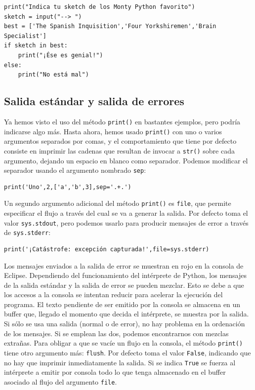 \begin{lstlisting}
print("Indica tu sketch de los Monty Python favorito")
sketch = input("--> ")
best = ['The Spanish Inquisition','Four Yorkshiremen','Brain Specialist']
if sketch in best:
	print("¡Ése es genial!")
else:
    print("No está mal")
\end{lstlisting}

\subsection{Salida estándar y salida de errores}

Ya hemos visto el uso del método \texttt{print()} en bastantes ejemplos, pero podría indicarse algo más. Hasta ahora, hemos usado \texttt{print()} con uno o varios argumentos separados por comas, y el comportamiento que tiene por defecto consiste en imprimir las cadenas que resultan de invocar a \texttt{str()} sobre cada argumento, dejando un espacio en blanco como separador. Podemos modificar el separador usando el argumento nombrado \texttt{sep}:

\begin{lstlisting}
print('Uno',2,['a','b',3],sep='.+.')
\end{lstlisting}

Un segundo argumento adicional del método \texttt{print()} es \texttt{file}, que permite especificar el flujo a través del cual se va a generar la salida. Por defecto toma el valor \texttt{sys.stdout}, pero podemos usarlo para producir mensajes de error a través de \texttt{sys.stderr}:

\begin{lstlisting}
print('¡Catástrofe: excepción capturada!',file=sys.stderr)
\end{lstlisting}

Los mensajes enviados a la salida de error se muestran en rojo en la consola de Eclipse. Dependiendo del funcionamiento del intérprete de Python, los mensajes de la salida estándar y la salida de error se pueden mezclar. Esto se debe a que los accesos a la consola se intentan reducir para acelerar la ejecución del programa. El texto pendiente de ser emitido por la consola se almacena en un buffer que, llegado el momento que decida el intérprete, se muestra por la salida. Si sólo se usa una salida (normal o de error), no hay problema en la ordenación de los mensajes. Si se emplean las dos, podemos encontrarnos con mezclas extrañas. Para obligar a que se vacíe un flujo en la consola, el método \texttt{print()} tiene otro argumento más: \texttt{flush}. Por defecto toma el valor \texttt{False}, indicando que no hay que imprimir inmediatamente la salida. Si se indica \texttt{True} se fuerza al intérprete a emitir por consola todo lo que tenga almacenado en el buffer asociado al flujo del argumento \texttt{file}.

